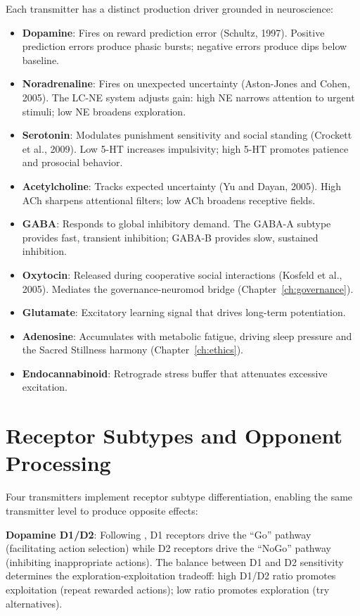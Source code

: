 \documentclass[12pt]{book}
\begin{document}
Each transmitter has a distinct production driver grounded in neuroscience:
\begin{itemize}
  \item \textbf{Dopamine}: Fires on reward prediction error (Schultz, 1997). Positive prediction errors produce phasic bursts; negative errors produce dips below baseline.
  \item \textbf{Noradrenaline}: Fires on unexpected uncertainty (Aston-Jones and Cohen, 2005). The LC-NE system adjusts gain: high NE narrows attention to urgent stimuli; low NE broadens exploration.
  \item \textbf{Serotonin}: Modulates punishment sensitivity and social standing (Crockett et al., 2009). Low 5-HT increases impulsivity; high 5-HT promotes patience and prosocial behavior.
  \item \textbf{Acetylcholine}: Tracks expected uncertainty (Yu and Dayan, 2005). High ACh sharpens attentional filters; low ACh broadens receptive fields.
  \item \textbf{GABA}: Responds to global inhibitory demand. The GABA-A subtype provides fast, transient inhibition; GABA-B provides slow, sustained inhibition.
  \item \textbf{Oxytocin}: Released during cooperative social interactions (Kosfeld et al., 2005). Mediates the governance-neuromod bridge (Chapter~\ref{ch:governance}).
  \item \textbf{Glutamate}: Excitatory learning signal that drives long-term potentiation.
  \item \textbf{Adenosine}: Accumulates with metabolic fatigue, driving sleep pressure and the Sacred Stillness harmony (Chapter~\ref{ch:ethics}).
  \item \textbf{Endocannabinoid}: Retrograde stress buffer that attenuates excessive excitation.
\end{itemize}

\section{Receptor Subtypes and Opponent Processing}

Four transmitters implement receptor subtype differentiation, enabling the same transmitter level to produce opposite effects:

\textbf{Dopamine D1/D2}: Following \citet{frank2005}, D1 receptors drive the ``Go'' pathway (facilitating action selection) while D2 receptors drive the ``NoGo'' pathway (inhibiting inappropriate actions). The balance between D1 and D2 sensitivity determines the exploration-exploitation tradeoff: high D1/D2 ratio promotes exploitation (repeat rewarded actions); low ratio promotes exploration (try alternatives).
\end{document}
